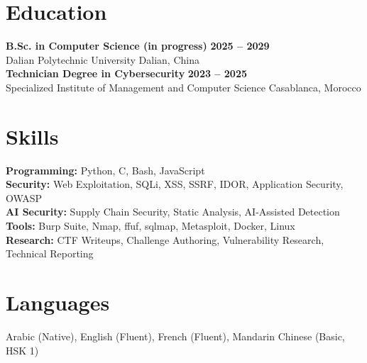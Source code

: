 \documentclass[10pt,letterpaper]{article}
\newcommand{\entry}[4]{
  \textbf{#1} \hfill \textbf{#2} \\
  {\color{resumegrey} #3} \hfill {\color{resumegrey} #4} \\
}
\begin{document}
\section*{Education}
\entry{B.Sc. in Computer Science (in progress)}{2025 -- 2029}{Dalian Polytechnic University}{Dalian, China}
\entry{Technician Degree in Cybersecurity}{2023 -- 2025}{Specialized Institute of Management and Computer Science}{Casablanca, Morocco}

\section*{Skills}
\textbf{Programming:} Python, C, Bash, JavaScript \\
\textbf{Security:} Web Exploitation, SQLi, XSS, SSRF, IDOR, Application Security, OWASP \\
\textbf{AI Security:} Supply Chain Security, Static Analysis, AI-Assisted Detection \\
\textbf{Tools:} Burp Suite, Nmap, ffuf, sqlmap, Metasploit, Docker, Linux \\
\textbf{Research:} CTF Writeups, Challenge Authoring, Vulnerability Research, Technical Reporting

\section*{Languages}
Arabic (Native), English (Fluent), French (Fluent), Mandarin Chinese (Basic, HSK 1)
\end{document}
